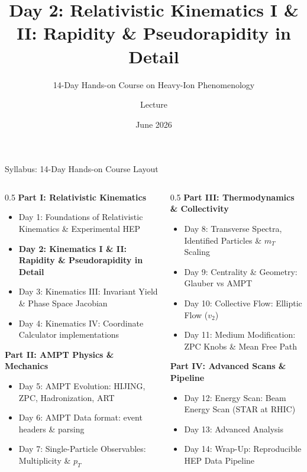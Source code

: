 \documentclass[aspectratio=169]{beamer}
\title[AMPT Course --- Day 2]{Day 2: Relativistic Kinematics I \& II: Rapidity \& Pseudorapidity in Detail}
\subtitle{14-Day Hands-on Course on Heavy-Ion Phenomenology}
\author[MSc-Lecture Series]{Lecture}
\institute[HEP Group]{NIT-J, HEP-119}
\date{June 2026}
\begin{document}
\begin{frame}
    \titlepage
\end{frame}

\begin{frame}{Syllabus: 14-Day Hands-on Course Layout}
    \begin{columns}
        \begin{column}{0.5\textwidth}
            \footnotesize
            \textbf{Part I: Relativistic Kinematics}
            \begin{itemize}
                \item Day 1: Foundations of Relativistic Kinematics \& Experimental HEP
                \item \textbf{Day 2: Kinematics I \& II: Rapidity \& Pseudorapidity in Detail}
                \item Day 3: Kinematics III: Invariant Yield \& Phase Space Jacobian
                \item Day 4: Kinematics IV: Coordinate Calculator implementations
            \end{itemize}
            \vspace{0.05cm}
            \textbf{Part II: AMPT Physics \& Mechanics}
            \begin{itemize}
                \item Day 5: AMPT Evolution: HIJING, ZPC, Hadronization, ART
                \item Day 6: AMPT Data format: event headers \& parsing
                \item Day 7: Single-Particle Observables: Multiplicity \& $p_T$
            \end{itemize}
        \end{column}
        \begin{column}{0.5\textwidth}
            \footnotesize
            \textbf{Part III: Thermodynamics \& Collectivity}
            \begin{itemize}
                \item Day 8: Transverse Spectra, Identified Particles \& $m_T$ Scaling
                \item Day 9: Centrality \& Geometry: Glauber vs AMPT
                \item Day 10: Collective Flow: Elliptic Flow ($v_2$)
                \item Day 11: Medium Modification: ZPC Knobs \& Mean Free Path
            \end{itemize}
            \vspace{0.1cm}
            \textbf{Part IV: Advanced Scans \& Pipeline}
            \begin{itemize}
                \item Day 12: Energy Scan: Beam Energy Scan (STAR at RHIC)
                \item Day 13: Advanced Analysis
                \item Day 14: Wrap-Up: Reproducible HEP Data Pipeline
            \end{itemize}
        \end{column}
    \end{columns}
\end{frame}
\end{document}
